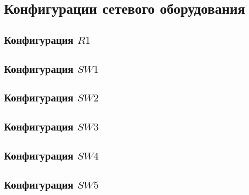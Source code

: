 \section{Конфигурации сетевого оборудования}

\subsection{Конфигурация $R1$}


\subsection{Конфигурация $SW1$}


\subsection{Конфигурация $SW2$}


\subsection{Конфигурация $SW3$}


\subsection{Конфигурация $SW4$}


\subsection{Конфигурация $SW5$}

\pagebreak